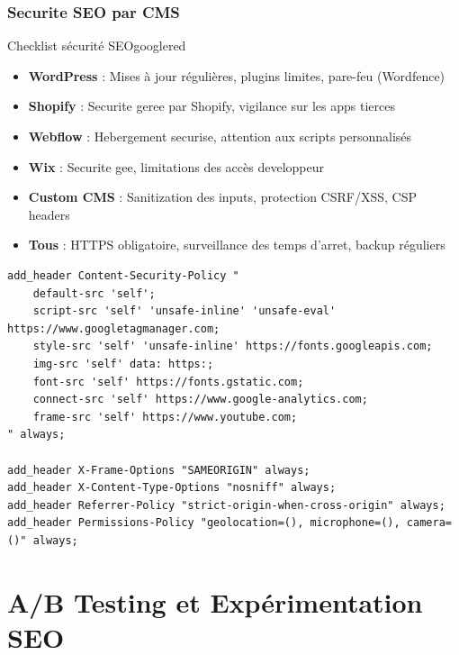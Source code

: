 \subsection{Securite SEO par CMS}

\begin{mybox}{Checklist sécurité SEO}{googlered}
\begin{itemize}
    \item \textbf{WordPress} : Mises à jour régulières, plugins limites, pare-feu (Wordfence)
    \item \textbf{Shopify} : Securite geree par Shopify, vigilance sur les apps tierces
    \item \textbf{Webflow} : Hebergement securise, attention aux scripts personnalisés
    \item \textbf{Wix} : Securite gee, limitations des accès developpeur
    \item \textbf{Custom CMS} : Sanitization des inputs, protection CSRF/XSS, CSP headers
    \item \textbf{Tous} : HTTPS obligatoire, surveillance des temps d'arret, backup réguliers
\end{itemize}
\end{mybox}

\begin{lstlisting}[style=code,caption={En-têtes de sécurité pour un CMS personnalisé (NGINX)}]
add_header Content-Security-Policy "
    default-src 'self';
    script-src 'self' 'unsafe-inline' 'unsafe-eval' https://www.googletagmanager.com;
    style-src 'self' 'unsafe-inline' https://fonts.googleapis.com;
    img-src 'self' data: https:;
    font-src 'self' https://fonts.gstatic.com;
    connect-src 'self' https://www.google-analytics.com;
    frame-src 'self' https://www.youtube.com;
" always;

add_header X-Frame-Options "SAMEORIGIN" always;
add_header X-Content-Type-Options "nosniff" always;
add_header Referrer-Policy "strict-origin-when-cross-origin" always;
add_header Permissions-Policy "geolocation=(), microphone=(), camera=()" always;
\end{lstlisting}


\chapter{A/B Testing et Expérimentation SEO}
\label{ch:seotesting}

